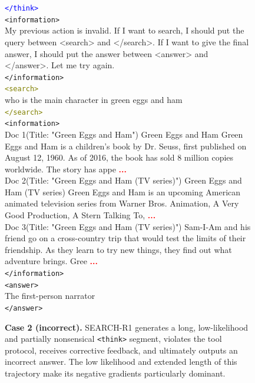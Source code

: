 \begin{figure}[t]
\begin{tcolorbox}[
  colback=white,
  colframe=black!60,
  title=\textbf{Question:} Who is the main character in green eggs and ham?
]
\textcolor{blue}{\texttt{</think>}}\\[0.7em]
\textcolor{red!70}{\texttt{<information>}}\\
My previous action is invalid. If I want to search, I should put the query between <search> and </search>. If I want to give the final answer, I should put the answer between <answer> and </answer>. Let me try again.\\
\textcolor{red!70}{\texttt{</information>}}\\[0.7em]
\textcolor{olive}{\texttt{<search>}}\\
who is the main character in green eggs and ham\\
\textcolor{olive}{\texttt{</search>}}\\[0.7em]
\textcolor{teal!60!black}{\texttt{<information>}}\\
Doc 1(Title: "Green Eggs and Ham") Green Eggs and Ham Green Eggs and Ham is a children's book by Dr. Seuss, first published on August 12, 1960. As of 2016, the book has sold 8 million copies worldwide. The story has appe \textcolor{red}{\textbf{...}} \\
Doc 2(Title: "Green Eggs and Ham (TV series)") Green Eggs and Ham (TV series) Green Eggs and Ham is an upcoming American animated television series from Warner Bros. Animation, A Very Good Production, A Stern Talking To, \textcolor{red}{\textbf{...}} \\
Doc 3(Title: "Green Eggs and Ham (TV series)") Sam-I-Am and his friend go on a cross-country trip that would test the limits of their friendship. As they learn to try new things, they find out what adventure brings. Gree \textcolor{red}{\textbf{...}}\\
\textcolor{teal!60!black}{\texttt{</information>}}\\[0.7em]
\textcolor{magenta!70!black}{\texttt{<answer>}}\\
The first-person narrator\\
\textcolor{magenta!70!black}{\texttt{</answer>}}\\[0.7em]
\end{tcolorbox}
\caption{\textbf{Case 2 (incorrect).} SEARCH-R1 generates a long, low-likelihood and partially nonsensical \texttt{<think>} segment, violates the tool protocol, receives corrective feedback, and ultimately outputs an incorrect answer. The low likelihood and extended length of this trajectory make its negative gradients particularly dominant.}
\label{fig:geeh-incorrect}
\end{figure}

